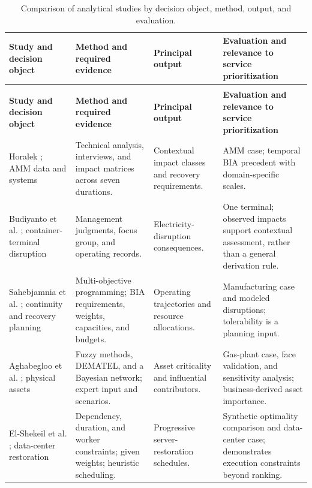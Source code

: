 \begingroup
\begin{landscape}
\small
\singlespacing
\setlength{\tabcolsep}{5pt}
\renewcommand{\arraystretch}{1.18}
\begin{longtable}{>{\raggedright\arraybackslash}p{3.5cm}>{\raggedright\arraybackslash}p{6.4cm}>{\raggedright\arraybackslash}p{4.3cm}>{\raggedright\arraybackslash}p{8.0cm}}
\caption{Comparison of analytical studies by decision object, method, output, and evaluation.}\label{tab:lr_bia_studies}\\
\toprule
\textbf{Study and decision object} & \textbf{Method and required evidence} & \textbf{Principal output} & \textbf{Evaluation and relevance to service prioritization} \\
\midrule
\endfirsthead
\multicolumn{4}{l}{Table \thetable\ continued}\\
\toprule
\textbf{Study and decision object} & \textbf{Method and required evidence} & \textbf{Principal output} & \textbf{Evaluation and relevance to service prioritization} \\
\midrule
\endhead
\bottomrule
\endfoot
Horalek \cite{amm2023bia}; AMM data and systems & Technical analysis, interviews, and impact matrices across seven durations. & Contextual impact classes and recovery requirements. & AMM case; temporal BIA precedent with domain-specific scales. \\
Budiyanto et al. \cite{container2021bia}; container-terminal disruption & Management judgments, focus group, and operating records. & Electricity-disruption consequences. & One terminal; observed impacts support contextual assessment, rather than a general derivation rule. \\
Sahebjamnia et al. \cite{sahebjamnia2015integrated}; continuity and recovery planning & Multi-objective programming; BIA requirements, weights, capacities, and budgets. & Operating trajectories and resource allocations. & Manufacturing case and modeled disruptions; tolerability is a planning input. \\
Aghabegloo et al. \cite{assetcriticality2023}; physical assets & Fuzzy methods, DEMATEL, and a Bayesian network; expert input and scenarios. & Asset criticality and influential contributors. & Gas-plant case, face validation, and sensitivity analysis; business-derived asset importance. \\
El-Shekeil et al. \cite{elshekeil2017precesion}; data-center restoration & Dependency, duration, and worker constraints; given weights; heuristic scheduling. & Progressive server-restoration schedules. & Synthetic optimality comparison and data-center case; demonstrates execution constraints beyond ranking. \\

\end{longtable}
\end{landscape}
